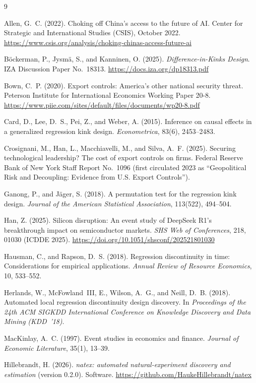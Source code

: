 \documentclass[11pt]{article}
\begin{document}
\scriptsize
\begin{thebibliography}{9}
\setlength{\itemsep}{1pt}\setlength{\parskip}{0pt}

Allen, G.~C. (2022).
Choking off China's access to the future of AI.
Center for Strategic and International Studies (CSIS), October 2022.
\url{https://www.csis.org/analysis/choking-chinas-access-future-ai}

B\"ockerman, P., Jysm\"a, S., and Kanninen, O. (2025).
\emph{Difference-in-Kinks Design}.
IZA Discussion Paper No.~18313.
\url{https://docs.iza.org/dp18313.pdf}

Bown, C.~P. (2020).
Export controls: America's other national security threat.
Peterson Institute for International Economics Working Paper 20-8.
\url{https://www.piie.com/sites/default/files/documents/wp20-8.pdf}

Card, D., Lee, D.~S., Pei, Z., and Weber, A. (2015).
Inference on causal effects in a generalized regression kink design.
\emph{Econometrica}, 83(6), 2453--2483.

Crosignani, M., Han, L., Macchiavelli, M., and Silva, A.~F. (2025).
Securing technological leadership? The cost of export controls on firms.
Federal Reserve Bank of New York Staff Report No.~1096 (first circulated 2023
as ``Geopolitical Risk and Decoupling: Evidence from U.S. Export
Controls'').

Ganong, P., and J\"ager, S. (2018).
A permutation test for the regression kink design.
\emph{Journal of the American Statistical Association}, 113(522), 494--504.

Han, Z. (2025).
Silicon disruption: An event study of DeepSeek R1's breakthrough impact on
semiconductor markets.
\emph{SHS Web of Conferences}, 218, 01030 (ICDDE 2025).
\url{https://doi.org/10.1051/shsconf/202521801030}

Hausman, C., and Rapson, D.~S. (2018).
Regression discontinuity in time: Considerations for empirical applications.
\emph{Annual Review of Resource Economics}, 10, 533--552.

Herlands, W., McFowland~III, E., Wilson, A.~G., and Neill, D.~B. (2018).
Automated local regression discontinuity design discovery.
In \emph{Proceedings of the 24th ACM SIGKDD International Conference on
Knowledge Discovery and Data Mining (KDD~'18)}.

MacKinlay, A.~C. (1997).
Event studies in economics and finance.
\emph{Journal of Economic Literature}, 35(1), 13--39.

Hillebrandt, H. (2026).
\emph{natex: automated natural-experiment discovery and estimation} (version
0.2.0). Software.
\url{https://github.com/HaukeHillebrandt/natex}

\end{thebibliography}
\end{document}
